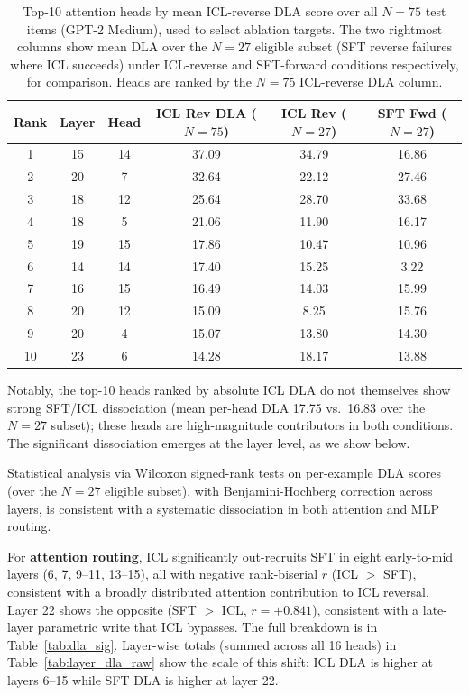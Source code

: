 \documentclass[11pt]{article}
\begin{document}
\begin{table}[h]
\centering
\caption{Top-10 attention heads by mean ICL-reverse DLA score over all $N=75$
test items (GPT-2 Medium), used to select ablation targets. The two rightmost
columns show mean DLA over the $N=27$ eligible subset (SFT reverse failures
where ICL succeeds) under ICL-reverse and SFT-forward conditions respectively,
for comparison. Heads are ranked by the $N=75$ ICL-reverse DLA column.}
\label{tab:top_heads}
\begin{tabular}{cccccc}
\toprule
\textbf{Rank} & \textbf{Layer} & \textbf{Head} & \textbf{ICL Rev DLA ($N=75$)} & \textbf{ICL Rev ($N=27$)} & \textbf{SFT Fwd ($N=27$)} \\
\midrule
1  & 15 & 14 & 37.09 & 34.79 & 16.86 \\
2  & 20 &  7 & 32.64 & 22.12 & 27.46 \\
3  & 18 & 12 & 25.64 & 28.70 & 33.68 \\
4  & 18 &  5 & 21.06 & 11.90 & 16.17 \\
5  & 19 & 15 & 17.86 & 10.47 & 10.96 \\
6  & 14 & 14 & 17.40 & 15.25 &  3.22 \\
7  & 16 & 15 & 16.49 & 14.03 & 15.99 \\
8  & 20 & 12 & 15.09 &  8.25 & 15.76 \\
9  & 20 &  4 & 15.07 & 13.80 & 14.30 \\
10 & 23 &  6 & 14.28 & 18.17 & 13.88 \\
\bottomrule
\end{tabular}
\end{table}

Notably, the top-10 heads ranked by absolute ICL DLA do not themselves show
strong SFT/ICL dissociation (mean per-head DLA 17.75 vs.\ 16.83 over the
$N=27$ subset); these heads are high-magnitude contributors in both conditions.
The significant dissociation emerges at the layer level, as we show below.

Statistical analysis via Wilcoxon signed-rank tests on per-example DLA scores
(over the $N=27$ eligible subset), with Benjamini-Hochberg correction across
layers, is consistent with a systematic dissociation in both attention and MLP
routing.

For \textbf{attention routing}, ICL significantly out-recruits SFT in eight
early-to-mid layers (6, 7, 9--11, 13--15), all with negative rank-biserial $r$
(ICL $>$ SFT), consistent with a broadly distributed attention contribution to
ICL reversal. Layer 22 shows the opposite (SFT $>$ ICL, $r = +0.841$),
consistent with a late-layer parametric write that ICL bypasses. The full
breakdown is in Table~\ref{tab:dla_sig}. Layer-wise totals (summed across all
16 heads) in Table~\ref{tab:layer_dla_raw} show the scale of this shift: ICL
DLA is higher at layers 6--15 while SFT DLA is higher at layer 22.
\end{document}
